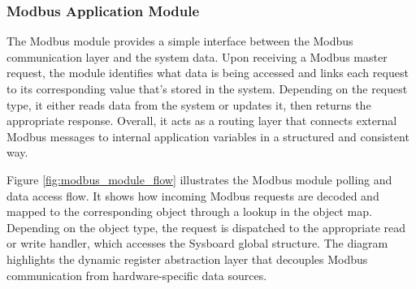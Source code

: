 \subsubsection{Modbus Application Module}
The Modbus module provides a simple interface between the Modbus communication layer and the system data. Upon receiving a Modbus master request, the module identifies what data is being accessed and links each request to its corresponding value that's stored in the system. Depending on the request type, it either reads data from the system or updates it, then returns the appropriate response. Overall, it acts as a routing layer that connects external Modbus messages to internal application variables in a structured and consistent way.

Figure \ref{fig:modbus_module_flow} illustrates the Modbus module polling and data access flow. It shows how incoming Modbus requests are decoded and mapped to the corresponding object through a lookup in the object map. Depending on the object type, the request is dispatched to the appropriate read or write handler, which accesses the Sysboard global structure. The diagram highlights the dynamic register abstraction layer that decouples Modbus communication from hardware-specific data sources.
